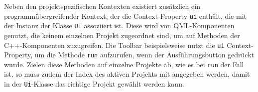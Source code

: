 Neben den projektspezifischen Kontexten existiert zusätzlich ein
programmübergreifender Kontext, der die Context-Property \texttt{ui} enthält,
die mit der Instanz der Klasse \texttt{Ui} assoziiert ist. Diese wird von
QML-Komponenten genutzt, die keinem einzelnen Projekt zugeordnet sind, um auf
Methoden der C++-Komponenten zuzugreifen. Die Toolbar beispielsweise nutzt die
\texttt{ui} Context-Property, um die Methode \texttt{run} aufzurufen, wenn der
Ausführungsbutton gedrückt wurde. Zielen diese Methoden auf einzelne Projekte
ab, wie es bei \texttt{run} der Fall ist, so muss zudem der Index des aktiven Projekts
mit angegeben werden, damit in der \texttt{Ui}-Klasse das richtige Projekt
gewählt werden kann.

